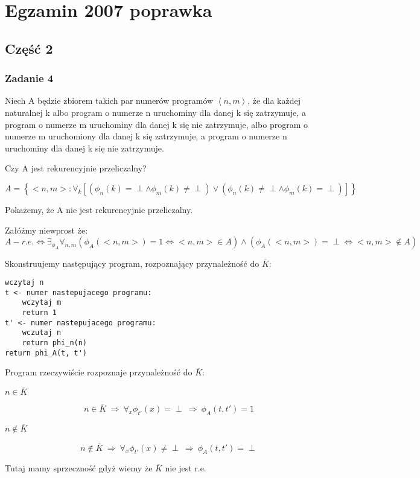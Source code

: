 \documentclass[svgnames]{report}
\begin{document}
\chapter{Egzamin 2007 poprawka}
\section{Część 2}
\subsection{Zadanie 4}
\begin{framed}
Niech A będzie zbiorem takich par numerów programów $\left<n, m\right>$, że dla każdej naturalnej k albo program o numerze n uruchominy dla danej k się zatrzymuje, a program o numerze m uruchominy dla danej k się nie zatrzymuje, albo program o numerze m uruchomiony dla danej k się zatrzymuje, a program o numerze n uruchominy dla danej k się nie zatrzymuje.

Czy A jest rekurencyjnie przeliczalny?
\end{framed}

\begin{equation}
A = \left\{<n,m> : \forall_k \left[ \left( \phi_n(k) = \perp \wedge \phi_m(k) \not= \perp \right) \vee \left( \phi_n(k) \not= \perp \wedge \phi_m(k) = \perp \right) \right] \right\}
\end{equation}

Pokażemy, że A nie jest rekurencyjnie przeliczalny.

Załóżmy niewprost że:
\begin{equation}
A - r.e. \Leftrightarrow \exists_{\phi_A} \forall_{n,m} (\phi_A(<n,m>) = 1 \Leftrightarrow <n,m> \in A) \wedge (\phi_A(<n,m>) = \perp \Leftrightarrow <n,m> \not\in A)
\end{equation}

Skonstruujemy następujący program, rozpoznający przynależność do $\overline{K}$:
\begin{lstlisting}
wczytaj n
t <- numer nastepujacego programu:
	wczytaj m
	return 1
t' <- numer nastepujacego programu:
	wczutaj n
	return phi_n(n)
return phi_A(t, t')
\end{lstlisting}
Program rzeczywiście rozpoznaje przynależność do $\overline{K}$:
\begin{description}
	\item[$n \in \overline{K}$]
		\begin{equation}
			n \in \overline{K} \ \Rightarrow \ \forall_x \phi_{t'}(x) = \perp \ \Rightarrow \ \phi_A(t, t') = 1
		\end{equation}
	\item[$n \not\in \overline{K}$]
		\begin{equation}
			n \not\in \overline{K} \ \Rightarrow \ \forall_x \phi_{t'}(x) \not= \perp \ \Rightarrow \ \phi_A(t, t') = \perp
		\end{equation}
\end{description}
Tutaj mamy sprzeczność gdyż wiemy że $\overline{K}$ nie jest r.e. 
\end{document}
